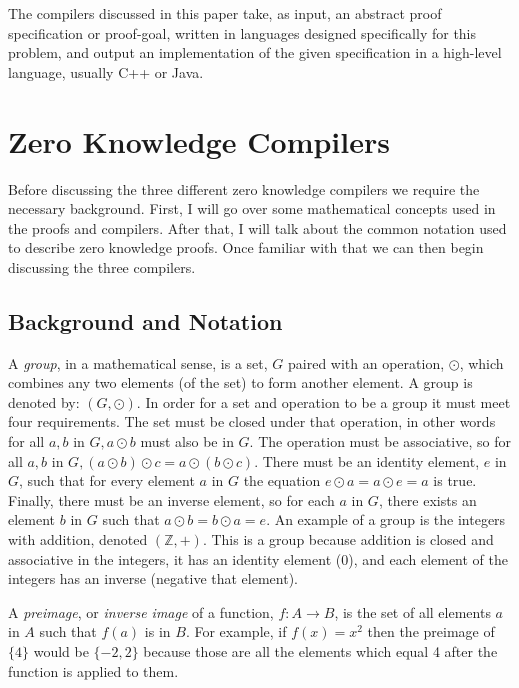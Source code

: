 \documentclass{sig-alternate}
\begin{document}
    The compilers discussed in this paper take, as input, an abstract proof 
    specification or proof-goal, written in languages designed specifically 
    for this problem, and output an implementation of the given specification in
    a high-level language, usually C++ or Java.
    
    
\section{Zero Knowledge Compilers}
	Before discussing the three different zero knowledge compilers we
	require the necessary background. First, I will go over some
	mathematical concepts used in the proofs and compilers.
	After that, I will talk about the common notation used to describe
	zero knowledge proofs. Once familiar with that we can then begin
	discussing the three compilers.
	
	\subsection{Background and Notation}
	A \textit{group}, in a mathematical sense, is a set, $G$ paired with an 
	operation, $\odot$, which combines any two elements (of the set) to form 
	another element. A group is denoted by: $(G, \odot)$. In order for a set
	and operation to be a group it must meet four requirements. The set must
	be closed under that operation, in other words for all $a, b$ in $G, a
	\odot b$ must also be in $G$. The operation must be associative, so for
	all $a, b$ in $G, (a \odot b) \odot c = a \odot (b \odot c)$. There must
	be an identity element, $e$ in $G$, such that for every element $a$ in $G$
	the equation $e \odot a = a \odot e = a$ is true. Finally, there must be
	an inverse element, so for each $a$ in $G$, there exists an element $b$ in
	$G$ such that $a \odot b = b \odot a = e$. An example of a group is the
	integers with addition, denoted $(\mathbb{Z}, +)$. This is a group because
	addition is closed and associative in the integers, it has an identity
	element (0), and each element of the integers has an inverse (negative 
	that element).
	
	A \textit{preimage}, or \textit{inverse image} of a function, $f:A \rightarrow B$, 
	is the set of all elements $a$ in $A$ such that $f(a)$ is in $B$. For example,
	if $f(x) = x^{2}$ then the preimage of $\{4\}$ would be $\{-2, 2\}$ because those
	are all the elements which equal 4 after the function is applied to them.
	
\end{document}
